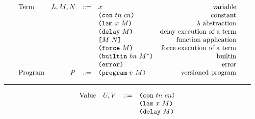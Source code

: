 \documentclass[../zerepoch-core-specification.tex]{subfiles}
\begin{document}
\begin{minipage}{\linewidth}
    \centering
    \[\begin{array}{lrclr}
    \textrm{Term}       & L,M,N  & ::= & x                      & \textrm{variable}\\
                        &        &     & \texttt{(} \texttt{con} ~ tn ~ cn \texttt{)}               & \textrm{constant}\\
                        &        &     & \texttt{(} \texttt{lam} ~ x ~ M  \texttt{)}            & \textrm{$\lambda$ abstraction}\\
                        &        &     & \texttt{(} \texttt{delay} ~ M \texttt{)}              & \textrm{delay execution of a term}\\
                        &        &     & \texttt{[} M ~ N \texttt{]}            & \textrm{function application}\\
                        &        &     & \texttt{(} \texttt{force} ~ M \texttt{)}              & \textrm{force execution of a term}\\
                        &        &     & \texttt{(} \texttt{builtin} ~ \mathit{bn} ~ M^* \texttt{)}     & \textrm{builtin}\\
                        &        &     & \texttt{(} \texttt{error} \texttt{)}                & \textrm{error}\\
        \textrm{Program}& P      & ::= & \texttt{(} \texttt{program} ~ v ~ M \texttt{)}         & \textrm{versioned program}

    \end{array}\]
    \label{fig:untyped-grammar}
\end{minipage}

\medskip\hrule\medskip

\begin{minipage}{\linewidth}
    \centering
    \[\begin{array}{lrcl}
        \textrm{Value}  & U, V   & ::= & \texttt{(} \texttt{con} ~ tn ~ cn \texttt{)}    \\
                        &        &     & \texttt{(} \texttt{lam} ~ x ~ M  \texttt{)} \\
                        &        &     & \texttt{(} \texttt{delay} ~ M \texttt{)}   
    \end{array}\]
    \label{fig:untyped-values}
\end{minipage}
\end{document}
